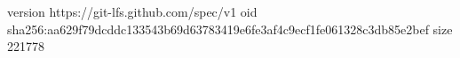 version https://git-lfs.github.com/spec/v1
oid sha256:aa629f79dcddc133543b69d63783419e6fe3af4c9ecf1fe061328c3db85e2bef
size 221778
